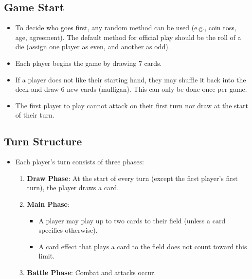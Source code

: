 \subsection{Game Start}
\begin{itemize}
    \item To decide who goes first, any random method can be used (e.g., coin toss, age, agreement). The default method for official play should be the roll of a die (assign one player as even, and another as odd).
    \item Each player begins the game by drawing 7 cards.
    \item If a player does not like their starting hand, they may shuffle it back into the deck and draw 6 new cards (mulligan). This can only be done once per game.
    \item The first player to play cannot attack on their first turn nor draw at the start of their turn.
\end{itemize}








\subsection{Turn Structure}
\begin{itemize}
\item Each player's turn consists of three phases:
	\begin{enumerate}
	    \item \textbf{Draw Phase}: At the start of every turn (except the first player's first turn), the player draws a card.
	    \item \textbf{Main Phase}:
	    \begin{itemize}
	        \item A player may play up to two cards to their field (unless a card specifies otherwise).
	        \item A card effect that plays a card to the field does not count toward this limit.
	    \end{itemize}
	    \item \textbf{Battle Phase}: Combat and attacks occur.
	\end{enumerate}
\end{itemize}








